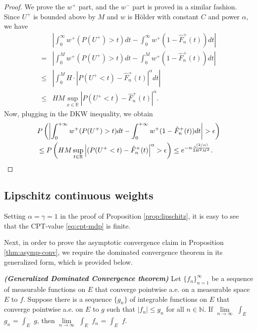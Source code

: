 \begin{proof}
We prove the $w^+$ part, and the $w^-$ part is proved in a similar fashion.
Since $U^+$ is bounded above by $M$ and $w$ is H\"{o}lder with constant $C$ and power $\alpha$, we have
\begin{align*}
&\left|\int_0^{\infty} w^+(P(U^+)>t) dt- \int_0^{\infty} w^+(1- {\hat F^+_n}(t)) dt\right| \\ = &
    \left|\int_0^M w^+(P(U^+)>t) dt- \int_0^M w^+(1- {\hat F^+_n}(t)) dt\right| \\
\leq& \left|\int_0^M H\cdot |P(U^+<t)-{\hat F^+_n}(t)|^\alpha dt\right|\\ \leq& HM\sup_{x\in
\mathbb{R}}\left|P(U^+<t)-{\hat F^+_n}(t)\right|^\alpha.
\end{align*}
Now, plugging in the DKW inequality, we obtain
\begin{align}
&
P\left(\left|\intinfinity w^+(P(U^+)>t) dt- \intinfinity w^+(1- {\hat F^+_n}(t)) dt\right|>\epsilon\right)
\nonumber\\
& \leq P\left(HM\sup_{t\in \mathbb{R}} \left|(P(U^+<t)-{\hat F^+_n}(t)\right|^\alpha>\epsilon\right)
\leq  e^{-n \frac{\epsilon ^{(2/\alpha)}} {2 H^2 M^2}}.\label{eq:dkw3}
\end{align}
\end{proof}

\subsection{Lipschitz continuous weights}
\label{sec:lipschitz-proofs}

 Setting $\alpha=\gamma=1$ in the proof of Proposition \ref{prop:lipschitz}, it is easy to see that the CPT-value \eqref{eq:cpt-mdp} is finite. 

Next, in order to prove the asymptotic convergence claim in Proposition \ref{thm:asymp-conv}, we require the dominated convergence theorem in its generalized form, which is provided below.
\begin{theorem}{\textbf{\textit{(Generalized Dominated Convergence theorem)}}}
Let $\{f_n\}_{n=1}^\infty$ be a sequence of measurable functions on $E$ that converge pointwise a.e. on a measurable space $E$ to $f$.  Suppose there is a sequence $\{g_n\}$ of integrable functions on $E$ that converge pointwise a.e. on $E$ to $g$ such that $|f_n| \leq g_n$ for all $n \in \mathbb{N}$.  
If $\lim\limits_{n \rightarrow \infty}$ $\int_E$ $g_n$ = $\int_E$ $g$, then $\lim\limits_{n \rightarrow \infty}$ $\int_E$ $f_n$ = $\int_E$ $f$.
\end{theorem}


